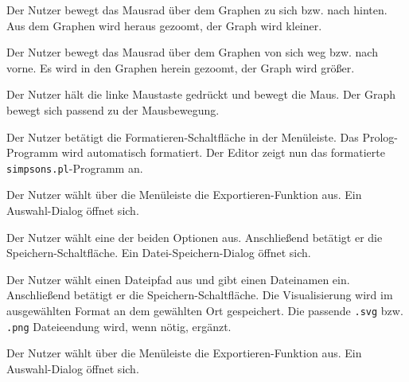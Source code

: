 \documentclass[parskip=full,11pt,twoside]{scrartcl}
\begin{document}
{Der Nutzer bewegt das Mausrad über dem Graphen zu sich bzw. nach hinten.}
{Aus dem Graphen wird heraus gezoomt, der Graph wird kleiner.}

{Der Nutzer bewegt das Mausrad über dem Graphen von sich weg bzw. nach vorne.}
{Es wird in den Graphen herein gezoomt, der Graph wird größer.}


{Der Nutzer hält die linke Maustaste gedrückt und bewegt die Maus.}
{Der Graph bewegt sich passend zu der Mausbewegung.}


{Der Nutzer betätigt die Formatieren-Schaltfläche in der Menüleiste.}
{Das Prolog-Programm wird automatisch formatiert. Der Editor zeigt nun das formatierte \texttt{simpsons.pl}-Programm an.}


{Der Nutzer wählt über die Menüleiste die Exportieren-Funktion aus.}
{Ein Auswahl-Dialog öffnet sich.}

{Der Nutzer wählt eine der beiden Optionen aus. Anschließend betätigt er die Speichern-Schaltfläche.}
{Ein Datei-Speichern-Dialog öffnet sich.}

{Der Nutzer wählt einen Dateipfad aus und gibt einen Dateinamen ein. Anschließend betätigt er die Speichern-Schaltfläche.}
{Die Visualisierung wird im ausgewählten Format an dem gewählten Ort gespeichert. Die passende \texttt{.svg} bzw. \texttt{.png} Dateieendung wird, wenn nötig, ergänzt.}


{Der Nutzer wählt über die Menüleiste die Exportieren-Funktion aus.}
{Ein Auswahl-Dialog öffnet sich.}
\end{document}
